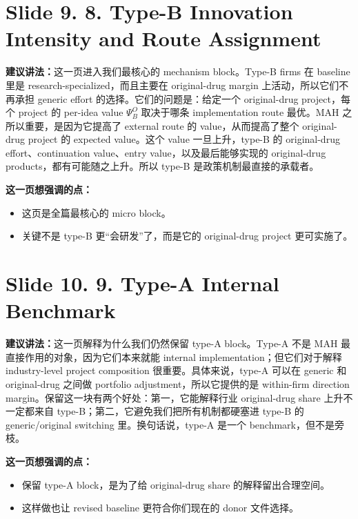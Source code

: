 \documentclass[12pt]{ctexart}
\begin{document}
\newpage
\section*{Slide 9. 8. Type-B Innovation Intensity and Route Assignment}
\textbf{建议讲法：}这一页进入我们最核心的 mechanism block。Type-B firms 在 baseline 里是 research-specialized，而且主要在 original-drug margin 上活动，所以它们不再承担 generic effort 的选择。它们的问题是：给定一个 original-drug project，每个 project 的 per-idea value $\Psi_B^O$ 取决于哪条 implementation route 最优。MAH 之所以重要，是因为它提高了 external route 的 value，从而提高了整个 original-drug project 的 expected value。这个 value 一旦上升，type-B 的 original-drug effort、continuation value、entry value，以及最后能够实现的 original-drug products，都有可能随之上升。所以 type-B 是政策机制最直接的承载者。

\vspace{0.5em}
\textbf{这一页想强调的点：}
\begin{itemize}
\item 这页是全篇最核心的 micro block。
\item 关键不是 type-B 更“会研发”了，而是它的 original-drug project 更可实施了。
\end{itemize}

\newpage
\section*{Slide 10. 9. Type-A Internal Benchmark}
\textbf{建议讲法：}这一页解释为什么我们仍然保留 type-A block。Type-A 不是 MAH 最直接作用的对象，因为它们本来就能 internal implementation；但它们对于解释 industry-level project composition 很重要。具体来说，type-A 可以在 generic 和 original-drug 之间做 portfolio adjustment，所以它提供的是 within-firm direction margin。保留这一块有两个好处：第一，它能解释行业 original-drug share 上升不一定都来自 type-B；第二，它避免我们把所有机制都硬塞进 type-B 的 generic/original switching 里。换句话说，type-A 是一个 benchmark，但不是旁枝。

\vspace{0.5em}
\textbf{这一页想强调的点：}
\begin{itemize}
\item 保留 type-A block，是为了给 original-drug share 的解释留出合理空间。
\item 这样做也让 revised baseline 更符合你们现在的 donor 文件选择。
\end{itemize}

\newpage
\end{document}
